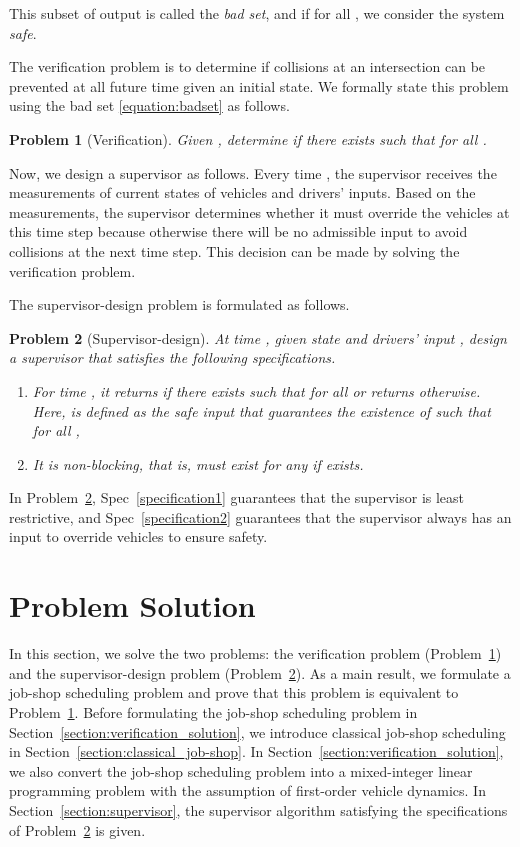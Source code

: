\documentclass{sig-alternate}
\newtheorem{problem}{Problem}
\begin{document}
This subset of output  is called the \textit{bad set}, and if  for all , we consider the system \textit{safe}.

The verification problem is to determine if collisions at an intersection can be prevented at all future time given an initial state. We formally state this problem using the bad set \eqref{equation:badset} as follows.

\begin{problem}[Verification]\label{problem:verification}
Given , determine if there exists  such that  for all .
\end{problem}	
	
	 
Now, we design a supervisor as follows. Every time , the supervisor receives the measurements of current states of vehicles and drivers' inputs. Based on the measurements, the supervisor determines whether it must override the vehicles at this time step because otherwise there will be no admissible input to avoid collisions at the next time step. This decision can be made by solving the verification problem. 

The supervisor-design problem is formulated as follows.
\begin{problem}[Supervisor-design]\label{problem:supervisor}
	At time , given state  and drivers' input , design a supervisor that satisfies the following specifications.
	\begin{enumerate}[{Spec} 1.]
		\item For time , it returns  if there exists  such that for all   or returns  otherwise. Here,  is defined as the safe input that guarantees the existence of  such that for all ,  \label{specification1}
		\item It is non-blocking, that is,  must exist for any  if  exists.\label{specification2}
	\end{enumerate}
\end{problem}	

In Problem~\ref{problem:supervisor}, Spec~\ref{specification1} guarantees that the supervisor is least restrictive, and Spec~\ref{specification2} guarantees that the supervisor always has an input to override vehicles to ensure safety.

\section{Problem Solution}\label{section:problem_solution}
In this section, we solve the two problems: the verification problem (Problem~\ref{problem:verification}) and the supervisor-design problem (Problem~\ref{problem:supervisor}). As a main result, we formulate a job-shop scheduling problem and prove that this problem is equivalent to Problem~\ref{problem:verification}. Before formulating the job-shop scheduling problem in Section~\ref{section:verification_solution}, we introduce classical job-shop scheduling in Section~\ref{section:classical_job-shop}. In Section~\ref{section:verification_solution}, we also convert the job-shop scheduling problem into a mixed-integer linear programming problem with the assumption of first-order vehicle dynamics. In Section~\ref{section:supervisor}, the supervisor algorithm satisfying the specifications of Problem~\ref{problem:supervisor} is given.
\end{document}
